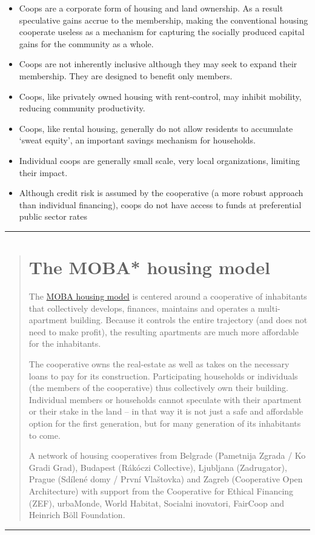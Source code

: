  \begin{itemize}
     \item Coops are a corporate form of housing and land ownership. As a result speculative gains accrue to the membership, making the conventional housing cooperate useless as a mechanism for capturing the socially produced capital gains for the community as a whole.
     \item Coops are not inherently inclusive although they may seek to expand their membership. They are designed to benefit only members. 

     \item Coops, like privately owned housing with rent-control, may inhibit mobility, reducing community productivity.
     \item Coops, like rental housing, generally do not allow residents to accumulate    `sweat equity', an important savings mechanism for  households.
     \item Individual coops are generally small scale, very local organizations, limiting their impact.
     \item Although credit risk is assumed by the cooperative  (a more robust approach than individual financing), coops do not have access to funds at preferential public sector rates
 \end{itemize}

 \hrule
\color{SeaGreen}\vspace{1cm}
\begin{quotation}
\section*{The MOBA* housing model}

The \href{https://moba.coop/}{MOBA housing model}  is centered around a cooperative of inhabitants that collectively develops, finances, maintains and operates a multi-apartment building. Because it controls the entire trajectory (and does not need to make profit), the resulting apartments are much more affordable for the inhabitants. 


The cooperative owns the real-estate as well as takes on the necessary loans to pay for its construction. Participating households or individuals (the members of the cooperative) thus collectively own their building. Individual members or households cannot speculate with their apartment or their stake in the land – in that way it is not just a safe and affordable option for the first generation, but for many generation of its inhabitants to come.  


\tiny * A network of housing cooperatives from Belgrade (Pametnija Zgrada / Ko Gradi Grad), Budapest (R\'ak\'oczi Collective),  Ljubljana (Zadrugator), Prague (Sd\'ilen\'e domy / První Vlaštovka) and Zagreb (Cooperative Open Architecture)  with support from the Cooperative for Ethical Financing (ZEF), urbaMonde, World Habitat, Socialni inovatori, FairCoop and Heinrich B\"oll Foundation.\normalsize

 \end{quotation}
 \vspace{1cm}
 \hrule
 \color{black}

